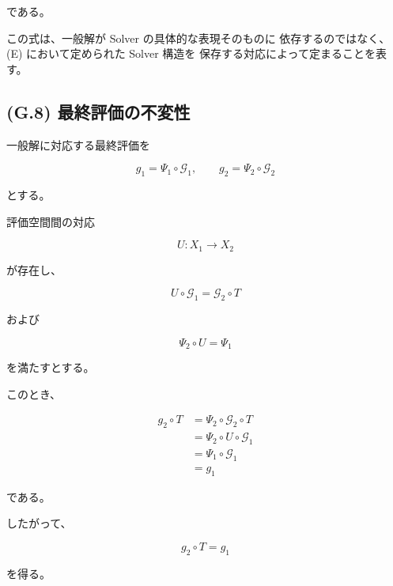 \documentclass[a4paper,11pt]{article}
\begin{document}
である。

この式は、一般解が Solver の具体的な表現そのものに
依存するのではなく、(E) において定められた Solver 構造を
保存する対応によって定まることを表す。


\subsection{(G.8) 最終評価の不変性}
\label{subsec:G8}

一般解に対応する最終評価を

\begin{equation}
    g_1
    =
    \Psi_1\circ\mathcal{G}_1,
    \qquad
    g_2
    =
    \Psi_2\circ\mathcal{G}_2
\end{equation}

とする。

評価空間間の対応

\begin{equation}
    U:
    X_1
    \longrightarrow
    X_2
\end{equation}

が存在し、

\begin{equation}
    U\circ\mathcal{G}_1
    =
    \mathcal{G}_2\circ T
\end{equation}

および

\begin{equation}
    \Psi_2\circ U
    =
    \Psi_1
\end{equation}

を満たすとする。

このとき、

\begin{align}
    g_2\circ T
    &=
    \Psi_2\circ\mathcal{G}_2\circ T
    \\
    &=
    \Psi_2\circ U\circ\mathcal{G}_1
    \\
    &=
    \Psi_1\circ\mathcal{G}_1
    \\
    &=
    g_1
\end{align}

である。

したがって、

\begin{equation}
    \boxed{
        g_2\circ T
        =
        g_1
    }
    \label{eq:G-scalar-invariance}
\end{equation}

を得る。
\end{document}
